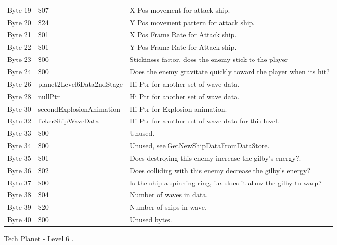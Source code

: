 \begin{figure}[H]
{\begin{adjustbox}{width=12cm}
\begin{tabular}{lll}
 Byte 19 & \$07                       & X Pos movement for attack ship.                                    \\
 Byte 20 & \$24                       & Y Pos movement pattern for attack ship.                            \\
 Byte 21 & \$01                       & X Pos Frame Rate for Attack ship.                                  \\
 Byte 22 & \$01                       & Y Pos Frame Rate for Attack ship.                                  \\
 Byte 23 & \$00                       & Stickiness factor, does the enemy stick to the player              \\
 Byte 24 & \$00                       & Does the enemy gravitate quickly toward the player when its hit?   \\
 Byte 26 & planet2Level6Data2ndStage & Hi Ptr for another set of wave data.                               \\
 Byte 28 & nullPtr                   & Hi Ptr for another set of wave data.                               \\
 Byte 30 & secondExplosionAnimation  & Hi Ptr for Explosion animation.                                    \\
 Byte 32 & lickerShipWaveData        & Hi Ptr for another set of wave data for this level.                \\
 Byte 33 & \$00                       & Unused.                                                            \\
 Byte 34 & \$00                       & Unused, see GetNewShipDataFromDataStore.                           \\
 Byte 35 & \$01                       & Does destroying this enemy increase the gilby's energy?.           \\
 Byte 36 & \$02                       & Does colliding with this enemy decrease the gilby's energy?        \\
 Byte 37 & \$00                       & Is the ship a spinning ring, i.e. does it allow the gilby to warp? \\
 Byte 38 & \$04                       & Number of waves in data.                                           \\
 Byte 39 & \$20                       & Number of ships in wave.                                           \\
 Byte 40 & \$00                       & Unused bytes.                                                      \\
\bottomrule
\end{tabular}

  \end{adjustbox}

  }\caption*{Tech Planet - Level 6
.}
\end{figure}

